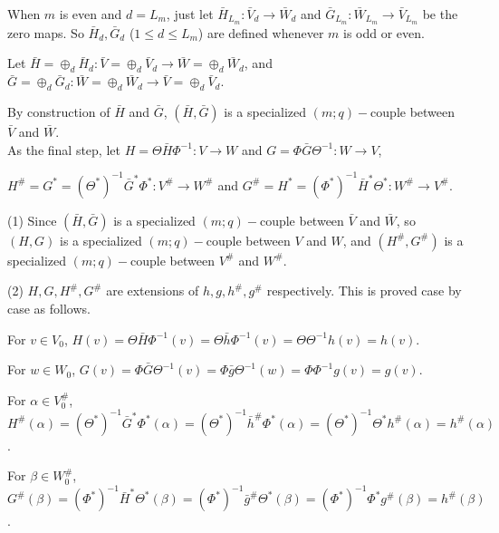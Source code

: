 \def\CTEXPreproc{Created by ctex v0.2.12, don't edit!}\documentclass[11pt]{article}
\begin{document}
\begin{pf}
 When $m$ is even and $d=L_m$, just let $\bar{H}_{L_m } : \bar{V}_d \rightarrow \bar{W}_d $ and  $\bar{G}_{L_m } : \bar{W}_{L_m } \rightarrow \bar{V}_{L_m }$ be the zero maps. So $\bar{H}_d ,\bar{G}_d $ ($1\leq d\leq L_m $) are defined whenever $m$ is odd or even.


      Let $\bar{H}=\oplus_d \bar{H}_d : \bar{V}=\oplus_d \bar{V}_d  \rightarrow \bar{W}=\oplus_d \bar{W}_d $, and
      $ \bar{G}=\oplus_d \bar{G}_d : \bar{W}=\oplus_d \bar{W}_d  \rightarrow \bar{V}=\oplus_d \bar{V}_d $.

      By construction of $\bar{H}$ and $\bar{G}$, $(\bar{H} ,\bar{G})$ is a specialized $(m;q)-$couple between $\bar{V}$ and $\bar{W}$. \\


     As the final step, let $H= \Theta \bar{H} \Phi^{-1}: V\rightarrow W$ and  $G=\Phi \bar{G} \Theta^{-1}:W\rightarrow V $,

      $H^{\#}=G^* = (\Theta^*)^{-1}\bar{G}^* \Phi^* : V^{\#}\rightarrow W^{\#} $ and
      $ G^{\#}=H^* = (\Phi^*)^{-1}\bar{H}^* \Theta^* : W^{\#}\rightarrow V^{\#}  $.

      (1) Since $( \bar{H} ,\bar{G} )$ is a specialized $(m;q)-$couple between $\bar{V}$ and $\bar{W}$, so $( H ,G )$ is a specialized $(m;q)-$couple between $V$ and $W$, and $( H^{\#} ,G^{\#} )$ is a specialized $(m;q)-$couple between $V^{\#}$ and $W^{\#}$.

      (2) $H,G,H^{\#},G^{\#}$ are extensions of $h,g,h^{\#}, g^{\#}$ respectively. This is proved case by case as follows.

      For $v\in V_0$, $H(v)=\Theta \bar{H} \Phi^{-1} (v) = \Theta \bar{h} \Phi^{-1}(v) =\Theta \Theta^{-1} h(v)= h(v) $.

      For $w\in W_0$, $G(v)=\Phi \bar{G} \Theta^{-1} (v) = \Phi \bar{g} \Theta^{-1}(w) =\Phi \Phi^{-1} g(v)= g(v) $.

      For $\alpha\in V^{\#}_0$, $ H^{\#}(\alpha)=(\Theta^* )^{-1} \bar{G}^{*} \Phi^{*}(\alpha) =
       (\Theta^* )^{-1} \bar{h}^{\#} \Phi^{*}(\alpha)=  (\Theta^* )^{-1} \Theta^* h^{\#}(\alpha)= h^{\#}(\alpha)$.

       For $\beta\in W^{\#}_0$, $ G^{\#}(\beta)=(\Phi^* )^{-1} \bar{H}^{*} \Theta^{*}(\beta) =
       (\Phi^* )^{-1} \bar{g}^{\#} \Theta^{*}(\beta)=  (\Phi^* )^{-1} \Phi^* g^{\#}(\beta)= h^{\#}(\beta)$.\\

















   \end{pf}
\end{document}
